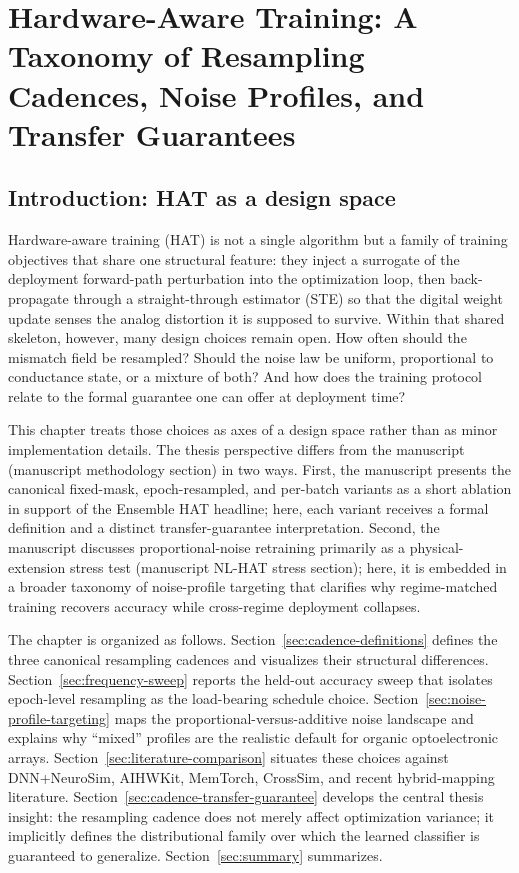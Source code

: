 \chapter{Hardware-Aware Training: A Taxonomy of Resampling Cadences, Noise Profiles, and Transfer Guarantees}
\label{chap:hat-taxonomy}

\section{Introduction: HAT as a design space}
\label{sec:hat-design-space}

Hardware-aware training (HAT) is not a single algorithm but a family of training objectives that share one structural feature: they inject a surrogate of the deployment forward-path perturbation into the optimization loop, then back-propagate through a straight-through estimator (STE) so that the digital weight update senses the analog distortion it is supposed to survive. Within that shared skeleton, however, many design choices remain open. How often should the mismatch field be resampled? Should the noise law be uniform, proportional to conductance state, or a mixture of both? And how does the training protocol relate to the formal guarantee one can offer at deployment time?

This chapter treats those choices as axes of a design space rather than as minor implementation details. The thesis perspective differs from the manuscript (manuscript methodology section) in two ways. First, the manuscript presents the canonical fixed-mask, epoch-resampled, and per-batch variants as a short ablation in support of the Ensemble HAT headline; here, each variant receives a formal definition and a distinct transfer-guarantee interpretation. Second, the manuscript discusses proportional-noise retraining primarily as a physical-extension stress test (manuscript NL-HAT stress section); here, it is embedded in a broader taxonomy of noise-profile targeting that clarifies why regime-matched training recovers accuracy while cross-regime deployment collapses.

The chapter is organized as follows. Section~\ref{sec:cadence-definitions} defines the three canonical resampling cadences and visualizes their structural differences. Section~\ref{sec:frequency-sweep} reports the held-out accuracy sweep that isolates epoch-level resampling as the load-bearing schedule choice. Section~\ref{sec:noise-profile-targeting} maps the proportional-versus-additive noise landscape and explains why ``mixed'' profiles are the realistic default for organic optoelectronic arrays. Section~\ref{sec:literature-comparison} situates these choices against DNN+NeuroSim, AIHWKit, MemTorch, CrossSim, and recent hybrid-mapping literature. Section~\ref{sec:cadence-transfer-guarantee} develops the central thesis insight: the resampling cadence does not merely affect optimization variance; it implicitly defines the distributional family over which the learned classifier is guaranteed to generalize. Section~\ref{sec:summary} summarizes.

